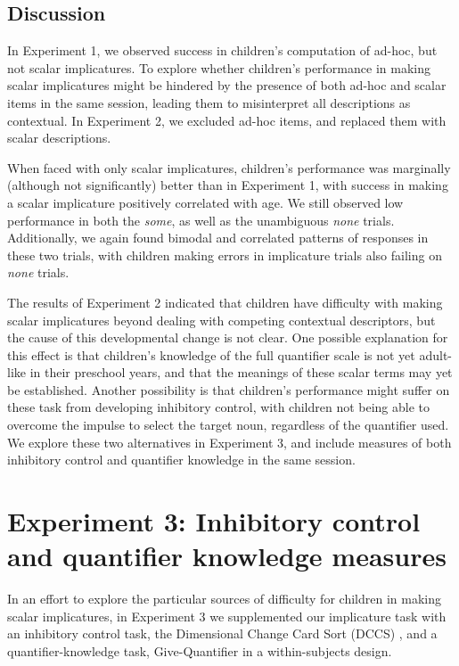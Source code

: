 \documentclass[man]{apa2}
\begin{document}
\subsection{Discussion}

In Experiment 1, we observed success in children's computation of ad-hoc, but not scalar implicatures. To explore whether children's performance in making scalar implicatures might be hindered by the presence of both ad-hoc and scalar items in the same session, leading them to misinterpret all descriptions as contextual. In Experiment 2, we excluded ad-hoc items, and replaced them with scalar descriptions. 

When faced with only scalar implicatures, children's performance was marginally (although not significantly) better than in Experiment 1, with success in making a scalar implicature positively correlated with age. We still observed low performance in both the \textit{some}, as well as the unambiguous \textit{none} trials. Additionally, we again found bimodal and correlated patterns of responses in these two trials, with children making errors in implicature trials also failing on \textit{none} trials. 

The results of Experiment 2 indicated that children have difficulty with making scalar implicatures beyond dealing with competing contextual descriptors, but the cause of this developmental change is not clear. One possible explanation for this effect is that children's knowledge of the full quantifier scale is not yet adult-like in their preschool years, and that the meanings of these scalar terms may yet be established. Another possibility is that children's performance might suffer on these task from developing inhibitory control, with children not being able to overcome the impulse to select the target noun, regardless of the quantifier used. We explore these two alternatives in Experiment 3, and include measures of both inhibitory control and quantifier knowledge in the same session. 

				
\section{Experiment 3: Inhibitory control and quantifier knowledge measures}

In an effort to explore the particular sources of difficulty for children in making scalar implicatures, in Experiment 3 we supplemented our implicature task with an inhibitory control task, the Dimensional Change Card Sort (DCCS) \cite{zelazo2006}, and a quantifier-knowledge task, Give-Quantifier \cite{barner2009} in a within-subjects design.  
\end{document}
